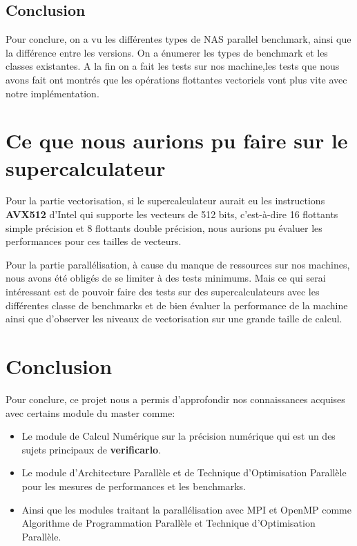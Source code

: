 \documentclass[11pt, letterpaper]{article}
\begin{document}
\subsection{Conclusion}
\label{sec:org3675db1}

Pour conclure, on a vu les différentes types de NAS parallel benchmark, ainsi que 
la différence entre les versions. On a énumerer les types de benchmark et les classes
existantes. A la fin on a fait les tests sur nos machine,les tests que nous avons fait 
ont montrés que les opérations flottantes vectoriels vont plus vite avec notre implémentation. 

\section{Ce que nous aurions pu faire sur le supercalculateur}
\label{sec:org32f6d61}

Pour la partie vectorisation, si le supercalculateur aurait eu les
instructions \textbf{AVX512} d'Intel qui supporte les vecteurs de 512 bits,
c'est-à-dire 16 flottants simple précision et 8 flottants double précision,
nous aurions pu évaluer les performances pour ces tailles de vecteurs.

Pour la partie parallélisation, à cause du manque de ressources sur nos
machines, nous avons été obligés de se limiter à des tests minimums. Mais ce
qui serai intéressant est de pouvoir faire des tests sur des supercalculateurs
avec les différentes classe de benchmarks et de bien évaluer la performance de
la machine ainsi que d'observer les niveaux de vectorisation sur une grande
taille de calcul.

\section{Conclusion}
\label{sec:orgd00debc}

Pour conclure, ce projet nous a permis d'approfondir nos connaissances acquises
avec certains module du master comme:
\begin{itemize}
\item Le module de Calcul Numérique sur la précision numérique qui est un des sujets
principaux de \textbf{verificarlo}.
\item Le module d'Architecture Parallèle et de Technique d'Optimisation Parallèle
pour les mesures de performances et les benchmarks.
\item Ainsi que les modules traitant la parallélisation avec MPI et OpenMP comme
Algorithme de Programmation Parallèle et Technique d'Optimisation Parallèle.
\end{itemize}
\end{document}
